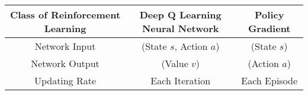 \documentclass{ctexart}
\begin{document}
	\begin{flushleft}
		\begin{tabular}{|c|c|c|}
			\hline
				Class of Reinforcement Learning&Deep Q Learning Neural Network&Policy Gradient \\ \hline
			Network Input&(State $s$, Action $a$)&(State $s$)\\ \hline
			Network Output&(Value $v$)&(Action $a$)\\ \hline
			Updating Rate&	Each Iteration&Each Episode\\ \hline			
		\end{tabular}
	\end{flushleft}
\end{document}
